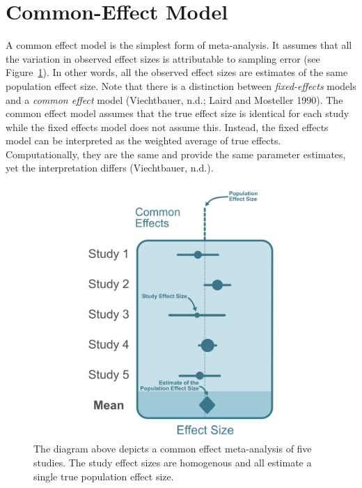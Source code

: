\documentclass[
  letterpaper,
  DIV=11,
  numbers=noendperiod]{scrreprt}
\begin{document}
\hypertarget{common-effect-model}{%
\section{Common-Effect Model}\label{common-effect-model}}

A common effect model is the simplest form of meta-analysis. It assumes
that all the variation in observed effect sizes is attributable to
sampling error (see Figure~\ref{fig-common-effect}). In other words, all
the observed effect sizes are estimates of the same population effect
size. Note that there is a distinction between \emph{fixed-effects}
models and a \emph{common effect} model (Viechtbauer, n.d.; Laird and
Mosteller 1990). The common effect model assumes that the true effect
size is identical for each study while the fixed effects model does not
assume this. Instead, the fixed effects model can be interpreted as the
weighted average of true effects. Computationally, they are the same and
provide the same parameter estimates, yet the interpretation differs
(Viechtbauer, n.d.).

\begin{figure}[H]

{\centering \includegraphics{figure/fixed_effects_diagram.png}

}

\caption{\label{fig-common-effect}The diagram above depicts a common
effect meta-analysis of five studies. The study effect sizes are
homogenous and all estimate a single true population effect size.}

\end{figure}
\end{document}
